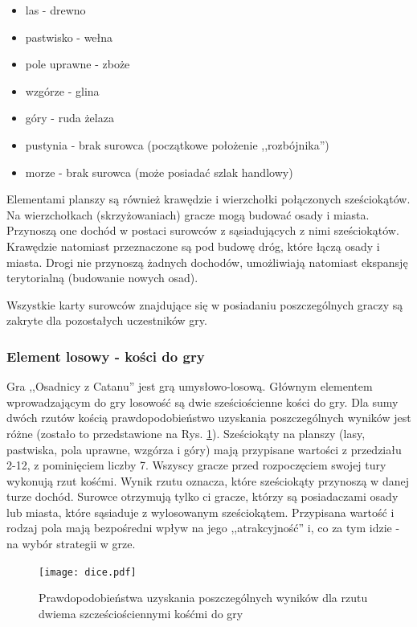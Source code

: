 \documentclass[a4paper,12pt]{article}
\providecommand{\imref}[1]{Rys. \ref{#1}} %
\begin{document}
\begin{itemize}
\item las - drewno
\item pastwisko - wełna
\item pole uprawne - zboże
\item wzgórze - glina
\item góry - ruda żelaza
\item pustynia - brak surowca (początkowe położenie ,,rozbójnika'')
\item morze - brak surowca (może posiadać szlak handlowy)
\end{itemize}

Elementami planszy są również krawędzie i wierzchołki połączonych
sześciokątów. Na wierzchołkach (skrzyżowaniach) gracze mogą budować
osady i miasta. Przynoszą one dochód w postaci surowców z
sąsiadujących z nimi sześciokątów. Krawędzie natomiast przeznaczone są
pod budowę dróg, które łączą osady i miasta. Drogi nie przynoszą
żadnych dochodów, umożliwiają natomiast ekspansję terytorialną
(budowanie nowych osad).

Wszystkie karty surowców znajdujące się w posiadaniu poszczególnych
graczy są zakryte dla pozostałych uczestników gry.

\subsubsection{Element losowy - kości do gry}
Gra ,,Osadnicy z Catanu'' jest grą umysłowo-losową. Głównym elementem
wprowadzającym do gry losowość są dwie sześciościenne kości do
gry. Dla sumy dwóch rzutów kością prawdopodobieństwo uzyskania
poszczególnych wyników jest różne (zostało to przedstawione na
\imref{dice}). Sześciokąty na planszy (lasy, pastwiska, pola uprawne,
wzgórza i góry) mają przypisane wartości z przedziału 2-12, z
pominięciem liczby 7. Wszyscy gracze przed rozpoczęciem swojej tury
wykonują rzut kośćmi. Wynik rzutu oznacza, które sześciokąty przynoszą
w danej turze dochód. Surowce otrzymują tylko ci gracze, którzy są
posiadaczami osady lub miasta, które sąsiaduje z wylosowanym
sześciokątem. Przypisana wartość i rodzaj pola mają bezpośredni wpływ
na jego ,,atrakcyjność'' i, co za tym idzie - na wybór strategii w
grze.

\begin{figure}[ht]
  \begin{center}
    \texttt{[image: dice.pdf]}
  \end{center}
  \caption{Prawdopodobieństwa uzyskania poszczególnych wyników dla
    rzutu dwiema szcześciościennymi kośćmi do gry}
  \label{dice}
\end{figure}
\end{document}
